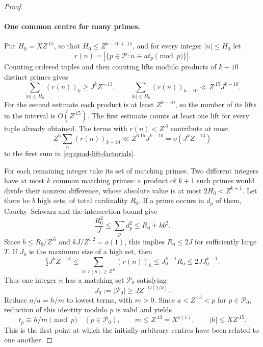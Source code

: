 \begin{proof}
\paragraph{One common centre for many primes.}
Put $H_0=XZ^{.15}$, so that $H_0\leq Z^{k-10+.15}$, and for every
integer $|n|\leq H_0$ let
\[
 r(n)=|\{p\in\mathcal P:n\equiv at_p\pmod p\}|.
\]
Counting ordered tuples and then counting lifts modulo products of
$k-10$ distinct primes gives
\begin{equation}\label{eq:quad-lift-factorials}
 \sum_{|n|\leq H_0}(r(n))_k\geq J^kZ^{-.13},\qquad
 \sum_{|n|\leq H_0}(r(n))_{k-10}\ll Z^{.15}J^{k-10}.
\end{equation}
For the second estimate each product is at least $Z^{k-10}$, so
the number of its lifts in the interval is $O(Z^{.15})$.
The first estimate counts at least one lift for every tuple already
obtained.  The terms with $r(n)<Z^{.6}$ contribute at most
\[
 Z^6\sum_n(r(n))_{k-10}\ll Z^{6.15}J^{k-10}
       =o(J^kZ^{-.13})
\]
to the first sum in \eqref{eq:quad-lift-factorials}.

For each remaining integer take its set of matching primes.  Two
different integers have at most $k$ common matching primes: a product
of $k+1$ such primes would divide their nonzero difference, whose
absolute value is at most $2H_0<Z^{k+1}$.
Let there be $b$ high sets, of total cardinality $R_0$.
If a prime occurs in $d_p$ of them, Cauchy--Schwarz and the
intersection bound give
\[
 \frac{R_0^2}{J}\leq\sum_pd_p^2\leq R_0+kb^2.
\]
Since $b\leq R_0/Z^{.6}$ and $kJ/Z^{1.2}=o(1)$, this implies
$R_0\leq2J$ for sufficiently large $T$.
If $J_0$ is the maximum size of a high set, then
\[
 \tfrac12J^kZ^{-.13}
 \leq\sum_{n:\,r(n)\geq Z^{.6}}(r(n))_k
 \leq J_0^{k-1}R_0\leq2JJ_0^{k-1}.
\]
Thus one integer $n$ has a matching set $\mathcal P_0$ satisfying
\begin{equation}\label{eq:quad-common-centre-size}
 J_0:=|\mathcal P_0|\geq JZ^{-O(1/k)}.
\end{equation}
Reduce $n/a=h/m$ to lowest terms, with $m>0$.
Since $a<Z^{.13}<p$ for $p\in\mathcal P_0$, reduction of this
identity modulo $p$ is valid and yields
\begin{equation}\label{eq:quad-common-centre}
 t_p\equiv h/m\pmod p\quad(p\in\mathcal P_0),\qquad
 m\leq Z^{.13}=X^{o(1)},\qquad |h|\leq XZ^{.15}.
\end{equation}
This is the first point at which the initially arbitrary centres
have been related to one another.


\end{proof}
